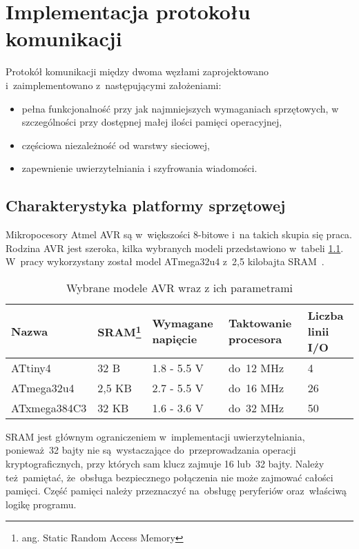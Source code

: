 \chapter{Implementacja protokołu komunikacji}
\label{cha:implementacja}

Protokół komunikacji między dwoma węzłami zaprojektowano i~zaimplementowano z~następującymi założeniami:

\begin{itemize}
\item pełna funkcjonalność przy jak najmniejszych wymaganiach sprzętowych, w szczególności przy dostępnej małej ilości pamięci operacyjnej,
\item częściowa niezależność od warstwy sieciowej,
\item zapewnienie uwierzytelniania i szyfrowania wiadomości.
\end{itemize}

\section{Charakterystyka platformy sprzętowej}
\label{cha:hardware}

Mikropocesory Atmel AVR są w~większości 8-bitowe i~na takich skupia się praca. Rodzina AVR jest szeroka, kilka wybranych modeli przedstawiono w~tabeli \ref{tab:avrmodels}. W~pracy wykorzystany został model ATmega32u4 z~2,5 kilobajta SRAM~\cite{Atmega32}.

\begin{table}[ht]
\centering
\caption{Wybrane modele AVR wraz z ich parametrami}
\begin{tabular}{|l|l|l|l|l|}
    \hline
    \textbf{Nazwa}  &
    \textbf{SRAM\footnote{ang. Static Random Access Memory}}  &
    \textbf{Wymagane napięcie}  &
    \textbf{Taktowanie procesora}  &
    \textbf{Liczba linii I/O} \\
    \hline
    ATtiny4 \cite{Attiny4}& 32 B & 1.8 - 5.5 V & do~12 MHz & 4\\
    \hline
    ATmega32u4 \cite{Atmega32} & 2,5 KB & 2.7 - 5.5 V & do~16 MHz & 26\\
    \hline
    ATxmega384C3 \cite{Atxmega384} & 32 KB & 1.6 - 3.6 V & do~32 MHz & 50\\
    \hline
\end{tabular}
\label{tab:avrmodels}
\end{table}

SRAM jest głównym ograniczeniem w~implementacji uwierzytelniania, ponieważ~32 bajty nie są wystaczające do~przeprowadzania operacji kryptograficznych, przy których sam klucz zajmuje 16 lub~32 bajty. Należy też pamiętać, że~obsługa bezpiecznego połączenia nie może zajmować całości pamięci. Część pamięci należy przeznaczyć na~obsługę peryferiów oraz~właściwą logikę programu.

